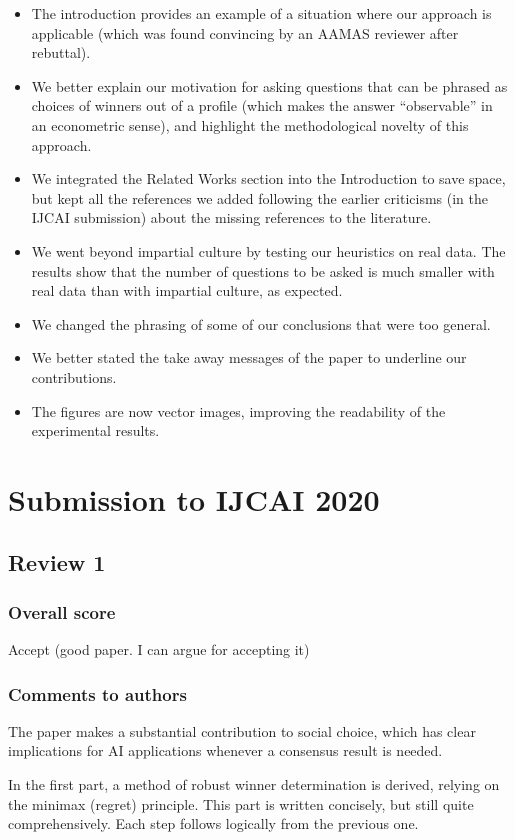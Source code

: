 \documentclass[version=3.21, pagesize, twoside=off, bibliography=totoc, DIV=calc, fontsize=12pt, a4paper]{scrartcl}
\begin{document}
\begin{itemize}
	\item The introduction provides an example of a situation where our approach is applicable (which was found convincing by an AAMAS reviewer after rebuttal).
	\item We better explain our motivation for asking questions that can be phrased as choices of winners out of a profile (which makes the answer “observable” in an econometric sense), and highlight the methodological novelty of this approach.
	\item We integrated the Related Works section into the Introduction to save space, but kept all the references we added following the earlier criticisms (in the IJCAI submission) about the missing references to the literature.
	\item We went beyond impartial culture by testing our heuristics on real data. The results show that the number of questions to be asked is much smaller with real data than with impartial culture, as expected.
	\item We changed the phrasing of some of our conclusions that were too general.
	\item We better stated the take away messages of the paper to underline our contributions.
	\item The figures are now vector images, improving the readability of the experimental results.
\end{itemize}

\section{Submission to IJCAI 2020} 
\label{sec:reviews-ijcai}
\subsection{Review 1}
\subsubsection*{Overall score}
Accept (good paper. I can argue for accepting it)
\subsubsection*{Comments to authors}
The paper makes a substantial contribution to social choice, which has clear implications for AI applications whenever a consensus result is needed.

In the first part, a method of robust winner determination is derived, relying on the minimax (regret) principle. This part is written concisely, but still quite comprehensively. Each step follows logically from the previous one.
\end{document}

